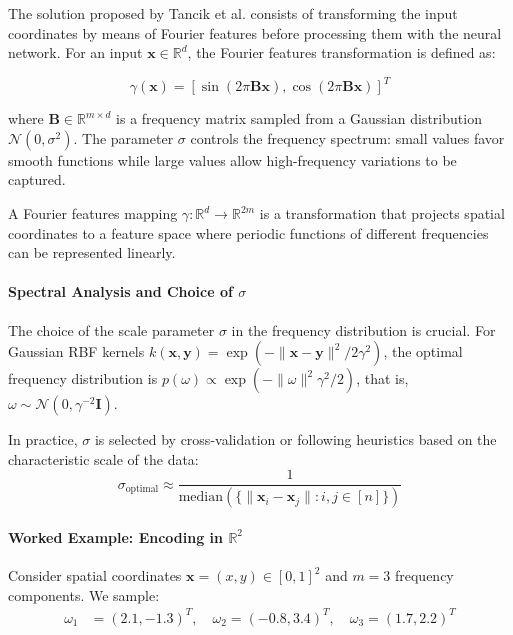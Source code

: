 The solution proposed by Tancik et al. consists of transforming the input coordinates by means of Fourier features before processing them with the neural network. For an input $\mathbf{x} \in \mathbb{R}^d$, the Fourier features transformation is defined as:

\begin{equation}
\gamma(\mathbf{x}) = \left[\sin(2\pi \mathbf{B}\mathbf{x}), \cos(2\pi \mathbf{B}\mathbf{x})\right]^T
\end{equation}

where $\mathbf{B} \in \mathbb{R}^{m \times d}$ is a frequency matrix sampled from a Gaussian distribution $\mathcal{N}(0, \sigma^2)$. The parameter $\sigma$ controls the frequency spectrum: small values favor smooth functions while large values allow high-frequency variations to be captured.

\begin{definition}
A Fourier features mapping $\gamma: \mathbb{R}^d \to \mathbb{R}^{2m}$ is a transformation that projects spatial coordinates to a feature space where periodic functions of different frequencies can be represented linearly.
\end{definition}

\paragraph{Spectral Analysis and Choice of $\sigma$}

The choice of the scale parameter $\sigma$ in the frequency distribution is crucial. For Gaussian RBF kernels $k(\mathbf{x}, \mathbf{y}) = \exp(-\|\mathbf{x} - \mathbf{y}\|^2 / 2\gamma^2)$, the optimal frequency distribution is $p(\omega) \propto \exp(-\|\omega\|^2 \gamma^2 / 2)$, that is, $\omega \sim \mathcal{N}(0, \gamma^{-2} \mathbf{I})$.

In practice, $\sigma$ is selected by cross-validation or following heuristics based on the characteristic scale of the data:
\begin{equation}
\sigma_{\text{optimal}} \approx \frac{1}{\text{median}(\{\|\mathbf{x}_i - \mathbf{x}_j\| : i, j \in [n]\})}
\end{equation}

\paragraph{Worked Example: Encoding in $\mathbb{R}^2$}

Consider spatial coordinates $\mathbf{x} = (x, y) \in [0, 1]^2$ and $m = 3$ frequency components. We sample:
\begin{align}
\omega_1 &= (2.1, -1.3)^T, \quad \omega_2 = (-0.8, 3.4)^T, \quad \omega_3 = (1.7, 2.2)^T
\end{align}

